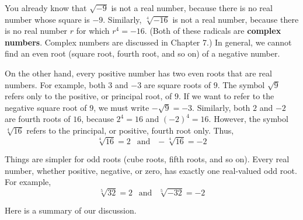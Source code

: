 \documentclass[10pt,]{book}
\newcommand{\terminology}[1]{\textbf{#1}}
\theoremstyle{plain}
\theoremstyle{definition}
\theoremstyle{definition}
\theoremstyle{definition}
\theoremstyle{definition}
\theoremstyle{definition}
\numberwithin{equation}{section}
\begin{document}
    You already know that \(\sqrt{−9}\) is not a real number, because there is no real number whose square is \(−9\). Similarly, \(\sqrt[4]{−16}\) is not a real number, because there is no real number \(r\) for which \(r^4 = −16\). (Both of these radicals are \terminology{complex numbers}. Complex numbers are discussed in Chapter 7.) In general, we cannot find an even root (square root, fourth root, and so on) of a negative number.
%
\par

    On the other hand, every positive number has two even roots that are real numbers. For example, both \(3\) and \(−3\) are square roots of \(9\). The symbol \(\sqrt{9}\) refers only to the positive, or principal root, of \(9\). If we want to refer to the negative square root of \(9\), we must write \(−\sqrt{9} = −3\). Similarly, both \(2\) and \(−2\) are fourth roots of \(16\), because \(2^4 = 16\) and \((−2)^4 = 16\). However, the symbol \(\sqrt[4]{16}\) refers to the principal, or positive, fourth root only. Thus,
    \begin{equation*}\sqrt[4]{16} = 2 ~~ \text{ and } ~~ −\sqrt[4]{16} = −2\end{equation*}
%
\par

    Things are simpler for odd roots (cube roots, fifth roots, and so on). Every real number, whether positive, negative, or zero, has exactly one real-valued odd root. For example,
    \begin{equation*}\sqrt[5]{32} = 2 ~~ \text{ and } ~~ \sqrt[5]{−32} = −2\end{equation*}
%
\par

    Here is a summary of our discussion.
%
\typeout{************************************************}
\typeout{************************************************}
\end{document}
